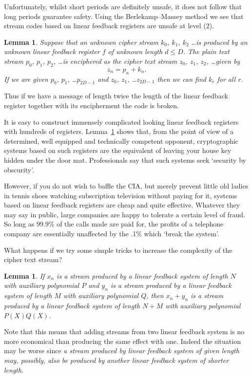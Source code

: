 \documentclass[12pt,a4paper]{article}
\theoremstyle{plain}
\newtheorem{lemma}[theorem]{Lemma}
\theoremstyle{definition}
\begin{document}
Unfortunately, whilst short periods are definitely
unsafe, it does not follow that long periods
guarantee safety. Using the
Berlekamp--Massey method we see that stream
codes based on linear feedback registers
are unsafe at level (2).
\begin{lemma}\label{can opener}
Suppose that an unknown
\emph{cipher stream} $k_{0}$, $k_{1}$,
$k_{2}$ \dots is produced by an
unknown linear feedback
register $f$ of unknown length $d\leq D$.
The \emph{plain text stream}
$p_{0}$, $p_{1}$, $p_{2}$, \dots is enciphered
as the \emph{cipher text stream}
$z_{0}$, $z_{1}$, $z_{2}$, \dots  given by
\[z_{n}=p_{n}+k_{n}.\]
If we are given $p_{0}$, $p_{1}$, \dots $p_{2D-1}$
and $z_{0}$, $z_{1}$, \dots $z_{2D-1}$
then we can find $k_{r}$ for all $r$.
\end{lemma}
Thus if we have a message of length twice the
length of the linear feedback register
together with its encipherment the code
is broken.

It is easy to construct immensely complicated looking
linear feedback registers with hundreds of registers.
Lemma~\ref{can opener}
shows that, from the point of view of a determined,
well equipped and technically competent
opponent, cryptographic systems based on such registers
are the equivalent of leaving your house key hidden
under the door mat.
Professionals say that such systems seek `security
by obscurity'.

However, if you do not wish
to baffle the CIA, but merely prevent little old
ladies in tennis shoes watching subscription
television without paying for it, systems
based on linear feedback registers are cheap
and quite effective. Whatever they may say in public,
large companies are happy to tolerate a certain level
of fraud. So long as 99.9\% of the calls made are
paid for, the profits of a telephone company are
essentially unaffected by the .1\% which `break the
system'.


What happens if we try some simple tricks
to increase the complexity of the
cipher text stream?
\begin{lemma}\label{clown one}
If $x_{n}$ is a stream
produced by a linear feedback system of length $N$
with auxiliary
polynomial $P$ and $y_{n}$  is a stream
produced by a linear feedback system of length $M$
with auxiliary polynomial $Q$,
then $x_{n}+y_{n}$ is a stream
produced by a linear feedback system of length $N+M$
with auxiliary polynomial $P(X)Q(X)$.
\end{lemma}
\noindent Note that this means that adding streams
from two linear feedback system
is no more  economical than producing
the same effect with one. Indeed the situation
may be worse since \emph{a stream produced by
linear feedback system of given length may, possibly,
also be produced  by another linear feedback system
of shorter length}.
\end{document}
